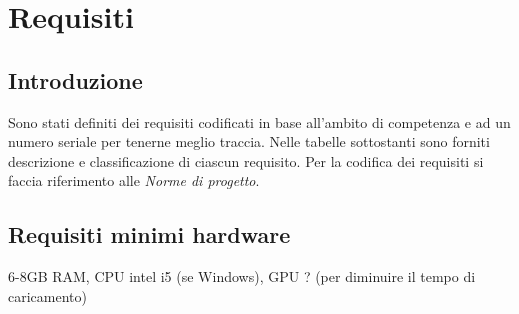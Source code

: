 


\newcommand{\RFM}{
    \stepcounter{M}
    \stepcounter{RF}
    \stepcounter{RF1}
    RF\arabic{RF}
}
\newcommand{\RFD}{
    \stepcounter{D}
    \stepcounter{RF}
    \stepcounter{RF2}
    RF\arabic{RF}
}
\newcommand{\RFO}{
    \stepcounter{O}
    \stepcounter{RF}
    \stepcounter{RF3}
    RF\arabic{RF}
}
\newcommand{\RVM}{
    \stepcounter{M}
    \stepcounter{RV}
    \stepcounter{RV1}
    RV\arabic{RV}
}
\newcommand{\RVD}{
    \stepcounter{D}
    \stepcounter{RV}
    \stepcounter{RV2}
    RV\arabic{RV}
}
\newcommand{\RVO}{
    \stepcounter{O}
    \stepcounter{RV}
    \stepcounter{RV3}
    RV\arabic{RV}
}
\newcommand{\RPM}{
    \stepcounter{M}
    \stepcounter{RP}
    \stepcounter{RP1}
    RP\arabic{RP}
}
\newcommand{\RPD}{
    \stepcounter{D}
    \stepcounter{RP}
    \stepcounter{RP2}
    RP\arabic{RP}
}
\newcommand{\RPO}{
    \stepcounter{O}
    \stepcounter{RP}
    \stepcounter{RP3}
    RP\arabic{RP}
}
\newcommand{\RQM}{
    \stepcounter{M}
    \stepcounter{RQ}
    \stepcounter{RQ1}
    RQ\arabic{RQ}
}
\newcommand{\RQD}{
    \stepcounter{D}
    \stepcounter{RQ}
    \stepcounter{RQ2}
    RQ\arabic{RQ}
}
\newcommand{\RQO}{
    \stepcounter{O}
    \stepcounter{RQ}
    \stepcounter{RQ3}
    RQ\arabic{RQ}
}



\section{Requisiti}
\subsection{Introduzione}
Sono stati definiti dei requisiti codificati in base all’ambito di competenza e ad un numero seriale per
tenerne meglio traccia. Nelle tabelle sottostanti sono forniti descrizione e classificazione di ciascun
requisito. 
Per la codifica dei requisiti si faccia riferimento alle \textit{Norme di progetto}.

\subsection{Requisiti minimi hardware}
6-8GB RAM, CPU intel i5 (se Windows), GPU ? (per diminuire il tempo di caricamento)




